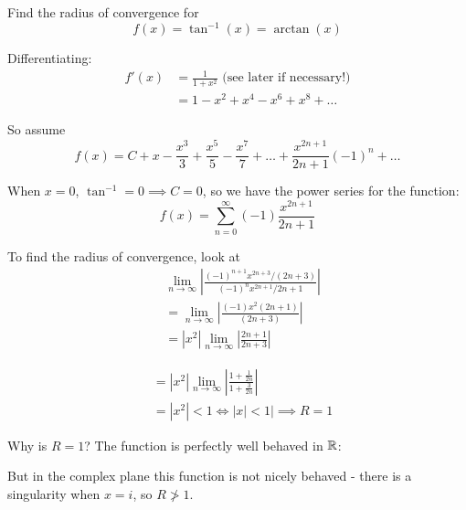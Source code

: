 \documentclass[twoside]{scrartcl}
\begin{document}
\begin{example}
Find the radius of convergence for 
\[f(x) = \tan^{-1}(x) = \arctan(x)\]

Differentiating: 
\[
\begin{aligned}
f'(x) &= \frac{1}{1+x^2} \text{ (see later if necessary!)}\\
&= 1 - x^2 + x^4 - x^6 + x^8 + \dots   
\end{aligned}
\]

So assume 
\[f(x) = C + x - \frac{x^3}{3} + \frac{x^5}{5} - \frac{x^7}{7} + \dots + \frac{x^{2n+1}}{2n+1}(-1)^n + \dots\]

When $x = 0$, $\tan^{-1} = 0 \implies C = 0$, so we have the power series for the function: 
\[f(x) = \sum_{n=0}^{\infty} (-1)\frac{x^{2n+1}}{2n+1}\]

To find the radius of convergence, look at 
\[
\begin{aligned}
  &\lim_{n\to \infty}\left|\frac{(-1)^{n+1}x^{2n+3}/(2n+3)}{(-1)^nx^{2n+1}/2n+1}\right|\\
  &= \lim_{n \to \infty} \left|\frac{(-1)x^2(2n+1)}{(2n+3)}\right|\\
  &= |x^2| \lim_{n\to \infty}\left|\frac{2n+1}{2n+3}\right| 
\end{aligned}
\]

\[
\begin{aligned}
    &= |x^2| \lim_{n\to \infty}\left|\frac{1 + \frac{1}{2n}}{1 + \frac{3}{2n}}\right|\\
  &= |x^2| < 1 \iff |x| < 1| \implies R = 1
\end{aligned}
\]


Why is $R = 1$? The function is perfectly well behaved in $\mathbb{R}$: 

\begin{center}
\end{center}

But in the complex plane this function is not nicely behaved - there is a singularity when $x = i$, so $R \not > 1$. 
\end{example}\vspace*{5pt}
\end{document}
